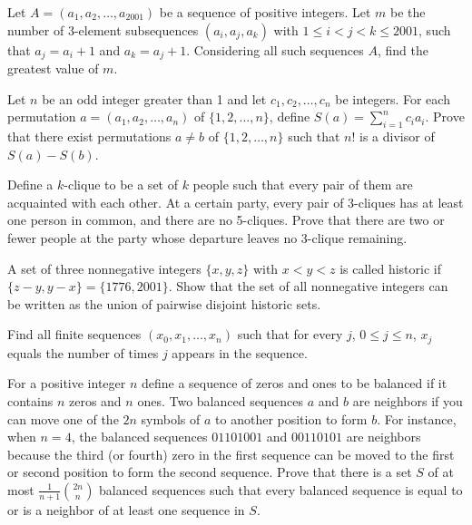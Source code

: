 \item[\textbf{C1.}]Let $A = (a_1, a_2, \ldots, a_{2001})$ be a sequence of positive integers. Let $m$ be the number of 3-element subsequences $(a_i,a_j,a_k)$ with $1 \leq i < j < k \leq 2001$,  such that $a_j = a_i + 1$ and $a_k = a_j + 1$.  Considering all such sequences $A$,  find the greatest value of $m$.

\item[\textbf{C2.}]Let $n$ be an odd integer greater than 1 and let $c_1, c_2, \ldots, c_n$ be integers. For each permutation $a = (a_1, a_2, \ldots, a_n)$ of $\{1,2,\ldots,n\}$,  define $S(a) = \sum_{i=1}^n c_i a_i$. Prove that there exist permutations $a \neq b$ of $\{1,2,\ldots,n\}$ such that $n!$ is a divisor of $S(a)-S(b)$.

\item[\textbf{C3.}]Define a $ k$-clique to be a set of $ k$ people such that every pair of them are acquainted with each other. At a certain party, every pair of 3-cliques has at least one person in common, and there are no 5-cliques. Prove that there are two or fewer people at the party whose departure leaves no 3-clique remaining.

\item[\textbf{C4.}]A set of three nonnegative integers $\{x,y,z\}$ with $x < y < z$ is called historic if $\{z-y,y-x\} = \{1776,2001\}$.  Show that the set of all nonnegative integers can be written as the union of pairwise disjoint historic sets.

\item[\textbf{C5.}]Find all finite sequences $(x_0, x_1, \ldots,x_n)$ such that for every $j$,  $0 \leq j \leq n$,  $x_j$ equals the number of times $j$ appears in the sequence.

\item[\textbf{C6.}]For a positive integer $n$ define a sequence of zeros and ones to be balanced if it contains $n$ zeros and $n$ ones. Two balanced sequences $a$ and $b$ are neighbors if you can move one of the $2n$ symbols of $a$ to another position to form $b$. For instance, when $n = 4$,  the balanced sequences $01101001$ and $00110101$ are neighbors because the third (or fourth) zero in the first sequence can be moved to the first or second position to form the second sequence. Prove that there is a set $S$ of at most $\frac{1}{n+1} \binom{2n}{n}$ balanced sequences such that every balanced sequence is equal to or is a neighbor of at least one sequence in $S$.

